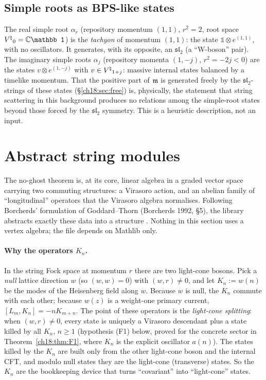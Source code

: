 \subsection{Simple roots as BPS-like states}

The real simple root $\alpha_r$ (repository momentum $(1,1)$, $r^2=2$, root space $\Vnat_0=\mathbb
C\mathbb 1$) is the \emph{tachyon} of momentum $(1,1)$: the state $\mathbb 1\otimes e^{(1,1)}$, with
no oscillators.  It generates, with its opposite, an $\mathfrak{sl}_2$ (a ``W-boson'' pair).  The
imaginary simple roots $\alpha_j$ (repository momenta $(1,-j)$, $r^2=-2j<0$) are the states
$v\otimes e^{(1,-j)}$ with $v\in{V^{\natural}}_{1+j}$: massive internal states balanced by a timelike momentum.
That the positive part of $\mathfrak{m}$ is generated freely by the $\mathfrak{sl}_2$-strings of these
states (\S\ref{ch18:sec:free}) is, physically, the statement that string scattering in this background
produces no relations among the simple-root states beyond those forced by the $\mathfrak{sl}_2$
symmetry.  This is a heuristic description, not an input.

\section{Abstract string modules}\label{ch18:sec:stringmodule}

The no-ghost theorem is, at its core, linear algebra in a graded vector space carrying two commuting
structures: a Virasoro action, and an abelian family of ``longitudinal'' operators that the Virasoro
algebra normalises.  Following Borcherds' formulation of Goddard--Thorn (Borcherds 1992, §5), the library abstracts
exactly these data into a structure .  Nothing in this section uses a vertex algebra; the file
depends on Mathlib only.

\paragraph{Why the operators $K_n$.}  In the string Fock space at momentum $r$ there are two light-cone bosons.  Pick a
\emph{null} lattice direction $w$ (so $(w,w)=0$) with $(w,r)\neq0$, and let $K_n:=w(n)$ be the modes of the Heisenberg field
along $w$.  Because $w$ is null, the $K_n$ commute with each other; because $w(z)$ is a weight-one primary current,
$[L_m,K_n]=-nK_{m+n}$.  The point of these operators is the \emph{light-cone splitting}: when $(w,r)\neq0$, every state is
uniquely a Virasoro descendant plus a state killed by all $K_n$, $n\ge1$ (hypothesis (F1) below, proved for the concrete
sector in Theorem~\ref{ch18:thm:F1}, where $K_n$ is the explicit oscillator $a(n)$).  The states killed by the $K_n$ are
built only from the other light-cone boson and the internal CFT, and modulo null states they are the light-cone
(transverse) states.  So the $K_n$ are the bookkeeping device that turns ``covariant'' into ``light-cone'' states.

